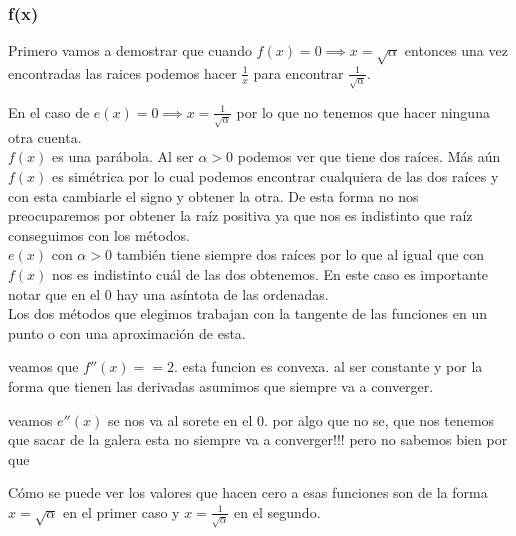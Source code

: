 \subsubsection{f(x)}

Primero vamos a demostrar que cuando $f(x) = 0 \implies x = \sqrt{\alpha}$
entonces una vez encontradas las raices podemos hacer $\frac{1}{x}$ para encontrar
$\displaystyle\frac{1}{\sqrt{\alpha}}$.

En el caso de $\displaystyle e(x) = 0 \implies x = \frac{1}{\sqrt{\alpha}}$ por lo que no tenemos que hacer
ninguna otra cuenta.\\



$f(x)$ es una parábola. Al ser $\alpha > 0$ podemos ver que tiene dos
raíces. Más aún $f(x)$ es simétrica por lo cual podemos encontrar cualquiera de
las dos raíces y con esta cambiarle el signo y obtener la otra. De esta forma
no nos preocuparemos por obtener la raíz positiva ya que nos es indistinto que
raíz conseguimos con los métodos.\\


$e(x)$ con $\alpha > 0$ también tiene siempre dos raíces por lo que al igual que con
$f(x)$ nos es indistinto cuál de las dos obtenemos. En este caso es importante
notar que en el 0 hay una asíntota de las ordenadas.\\
 
Los dos métodos que elegimos trabajan con la tangente de las funciones en un
punto o con una aproximación de esta.




veamos que $f''(x) == 2$. esta funcion es convexa. al ser constante y por la
forma que tienen las derivadas asumimos que siempre va a converger.

veamos $e''(x)$ se nos va al sorete en el 0. por algo que no se, que nos tenemos
que sacar de la galera esta no siempre va a converger!!! pero no sabemos bien
por que


Cómo se puede ver los valores que hacen cero a esas funciones son de la forma
$x = \sqrt{\alpha}$ en el primer caso y $x = \frac{1}{\sqrt{\alpha}}$ en el
segundo.

